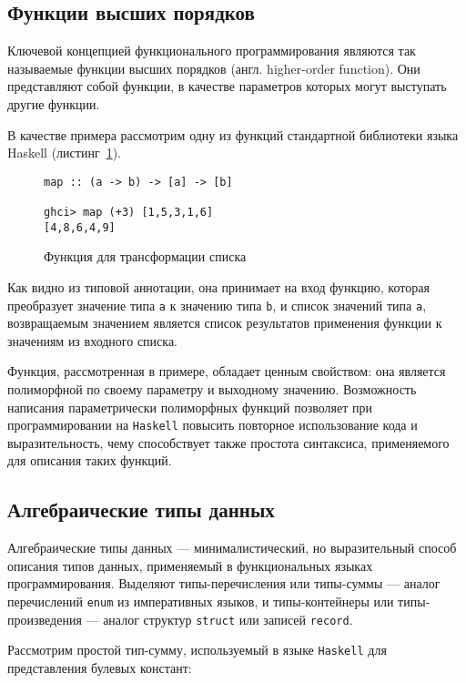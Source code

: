 \subsection{Функции высших порядков}
Ключевой концепцией функционального программирования являются так называемые 
функции высших порядков (англ. higher-order function). Они представляют собой 
функции, в качестве параметров которых могут выступать другие функции.

В качестве примера рассмотрим одну из функций стандартной библиотеки языка 
Haskell (листинг~\ref{listing:map}).

\begin{figure}[h]
\begin{lstlisting}
map :: (a -> b) -> [a] -> [b]

ghci> map (+3) [1,5,3,1,6]
[4,8,6,4,9]
\end{lstlisting}
\caption{Функция для трансформации списка}
\label{listing:map}
\end{figure}

Как видно из типовой аннотации, она принимает на вход функцию, которая преобразует 
значение типа \lstinline{a} к значению типа \lstinline{b}, и список значений 
типа \lstinline{a}, возвращаемым значением является список результатов 
применения функции к значениям из входного списка.

Функция, рассмотренная в примере, обладает ценным свойством: она является 
полиморфной по своему параметру и выходному значению. Возможность написания 
параметрически полиморфных функций позволяет при программировании на 
\lstinline{Haskell} повысить повторное использование кода и выразительность, 
чему способствует также простота синтаксиса, применяемого для описания таких 
функций.

\subsection{Алгебраические типы данных}

Алгебраические типы данных --- минималистический, но выразительный способ 
описания типов данных, применяемый в функциональных языках программирования. 
Выделяют типы-перечисления или типы-суммы --- аналог перечислений 
\lstinline{enum} из императивных языков, и типы-контейнеры или типы-произведения
 --- аналог структур \lstinline{struct} или записей \lstinline{record}.


Рассмотрим простой тип-сумму, используемый в языке \lstinline{Haskell} для 
представления булевых констант:

